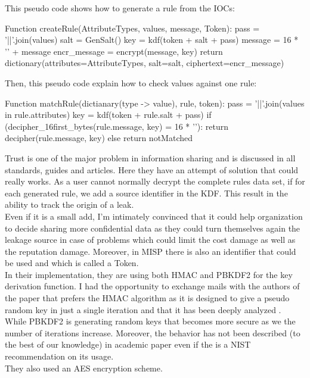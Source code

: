 \documentclass{eplmastersthesis}
\begin{document}
This pseudo code shows how to generate a rule from the IOCs:

\begin{center}
\begin{boxedverbatim}
Function createRule(AttributeTypes, values, message, Token):
        pass = '||'.join(values)
        salt = GenSalt()
        key = kdf(token + salt + pass)
        message = 16 * '' + message
        encr_message = encrypt(message, key)
        return dictionary(attributes=AttributeTypes, 
                            salt=salt,
                            ciphertext=encr_message)
\end{boxedverbatim}
\end{center}

Then, this pseudo code explain how to check values against one rule:
\begin{center}
\begin{boxedverbatim}
Function matchRule(dictianary(type -> value), rule, token):
        pass = '||'.join(values in rule.attributes)
        key = kdf(token + rule.salt + pass)
        if (decipher_16first_bytes(rule.message, key) = 16 * ''):
                return decipher(rule.message, key)
        else
                return notMatched
\end{boxedverbatim}
\end{center}


Trust is one of the major problem in information sharing and is discussed in all standards, guides and articles. Here they have an attempt of solution that could really works. As a user cannot normally decrypt the complete rules data set, if for each generated rule, we add a source identifier in the KDF. This result in the ability to track the origin of a leak. \\
Even if it is a small add, I'm intimately convinced that it could help organization to decide sharing more confidential data as they could turn themselves 
again the leakage source in case of problems which could limit the cost damage as well as the reputation damage. Moreover, in MISP there is also an identifier that could be used and which is called a Token.\\

In their implementation, they are using both HMAC and PBKDF2 for the key derivation function. I had the opportunity to exchange mails with the authors of the paper that prefers the HMAC algorithm as it is designed to give a pseudo random key in just a single iteration and that it has been deeply analyzed \cite{cryptoeprint}. While PBKDF2 is generating random keys that becomes more secure as we the number of iterations increase. Moreover, the behavior has not been described (to the best of our knowledge) in academic paper even if the is a NIST recommendation on its usage.\\
They also used an AES encryption scheme.\\
\end{document}
